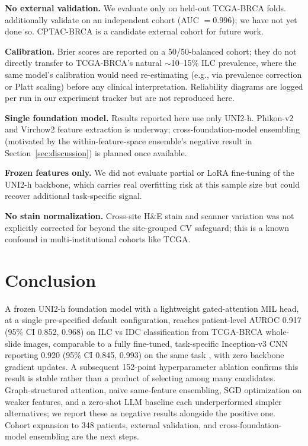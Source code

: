 \documentclass{article}
\begin{document}
\textbf{No external validation.} We evaluate only on held-out TCGA-BRCA folds. \citet{ektefaie2021integrative} additionally validate on an independent cohort (AUC $=0.996$); we have not yet done so. CPTAC-BRCA is a candidate external cohort for future work.

\textbf{Calibration.} Brier scores are reported on a 50/50-balanced cohort; they do not directly transfer to TCGA-BRCA's natural $\sim$10--15\% ILC prevalence, where the same model's calibration would need re-estimating (e.g., via prevalence correction or Platt scaling) before any clinical interpretation. Reliability diagrams are logged per run in our experiment tracker but are not reproduced here.

\textbf{Single foundation model.} Results reported here use only UNI2-h. Phikon-v2 and Virchow2 feature extraction is underway; cross-foundation-model ensembling (motivated by the within-feature-space ensemble's negative result in Section~\ref{sec:discussion}) is planned once available.

\textbf{Frozen features only.} We did not evaluate partial or LoRA fine-tuning of the UNI2-h backbone, which carries real overfitting risk at this sample size but could recover additional task-specific signal.

\textbf{No stain normalization.} Cross-site H\&E stain and scanner variation was not explicitly corrected for beyond the site-grouped CV safeguard; this is a known confound in multi-institutional cohorts like TCGA.

\section{Conclusion}

A frozen UNI2-h foundation model with a lightweight gated-attention MIL head, at a single pre-specified default configuration, reaches patient-level AUROC 0.917 (95\% CI 0.852, 0.968) on ILC vs IDC classification from TCGA-BRCA whole-slide images, comparable to a fully fine-tuned, task-specific Inception-v3 CNN reporting 0.920 (95\% CI 0.845, 0.993) on the same task \citep{ektefaie2021integrative}, with zero backbone gradient updates. A subsequent 152-point hyperparameter ablation confirms this result is stable rather than a product of selecting among many candidates. Graph-structured attention, naive same-feature ensembling, SGD optimization on weaker features, and a zero-shot LLM baseline each underperformed simpler alternatives; we report these as negative results alongside the positive one. Cohort expansion to 348 patients, external validation, and cross-foundation-model ensembling are the next steps.



\end{document}
